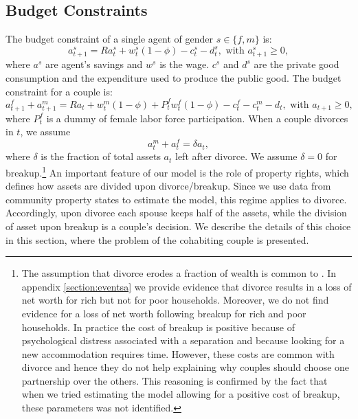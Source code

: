 \documentclass[12pt]{article}
\numberwithin{table}{section}
\begin{document}
\subsection{Budget Constraints}
The budget constraint of a single agent of gender  $s\in\{f,m\}$ is:
\begin{equation}\label{eq:bcs}
a^s_{t+1}=R a^s_t+w^s_t(1-\phi)-c^s_t-d^s_t, \text{ with }a^s_{t+1}\geq0,
\end{equation}
where $a^s$ are agent's savings and $w^s$ is the wage. $c^s$ and $d^s$ are the private good consumption and the expenditure used to produce the public good.
The budget constraint for a couple is:
\begin{equation}\label{eq:bcm}
a^f_{t+1}+a^m_{t+1}=R a_t+w^m_t(1-\phi)+P^f_t w^f_t(1-\phi)-c^f_t-c^m_t-d_t, \text{ with }a_{t+1}\geq0,
\end{equation}
where $P^f_t$ is a dummy of female labor force participation.
When a couple divorces in $t$, we assume 
\[a^m_t+a^f_t=\delta a_t,\]
where $\delta$ is the fraction of total assets $a_t$ left after divorce. We assume $\delta=0$ for breakup.\footnote{The assumption that divorce erodes a fraction of wealth is common to \cite{cubeddu2003}. In appendix \ref{section:eventsa} we provide evidence that divorce results in a loss of net worth for rich but not for poor households. Moreover, we do not find evidence for a loss of net worth following breakup for rich and poor households. In practice the cost of breakup is positive because of psychological distress associated with a separation and because looking for a new accommodation requires time. However, these costs are common with divorce and hence they do not help explaining why couples should choose one partnership over the others. This reasoning is confirmed by the fact that when we tried estimating the model allowing for a positive cost of breakup, these parameters was not identified.} 
An important feature of our model is the role of property rights, which defines how assets are divided upon divorce/breakup. Since we use data from community property states to estimate the model, this regime applies to divorce. Accordingly, upon divorce each spouse keeps half of the assets, while the division of asset upon breakup is a couple's decision. We describe the details of this choice in this section, where the problem of the cohabiting couple is presented.
\end{document}
